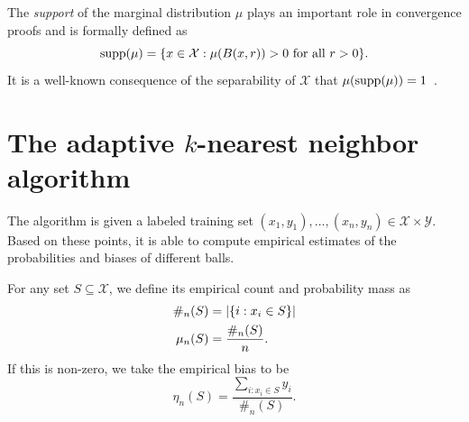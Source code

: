 \documentclass{article}
\def\X{{\mathcal X}}
\def\Y{{\mathcal Y}}
\def\supp{{\rm supp}}
\begin{document}
The {\it support} of the marginal distribution $\mu$ plays an important role in convergence proofs and is formally defined as
$$ \supp(\mu) = \{x \in \X: \mbox{$\mu(B(x,r)) > 0$ for all $r > 0$}\} .$$
It is a well-known consequence of the separability of $\X$ that $\mu(\supp(\mu)) = 1$~\cite{CH67}.



\section{The adaptive $k$-nearest neighbor algorithm}

The algorithm is given a labeled training set
$(x_1, y_1), \ldots, (x_n, y_n) \in \X \times \Y$.
Based on these points, it is able to compute empirical estimates of the probabilities and biases of different balls.

For any set $S \subseteq \X$, we define its empirical count and probability mass as
\begin{align}
\notag \#_n(S) &= |\{i: x_i \in S\}| \\
\mu_n(S) &= \frac{\#_n(S)}{n} .
\label{eq:empirical-mass}
\end{align}
If this is non-zero, we take the empirical bias to be
\begin{equation}
\eta_n(S) = \frac{\sum_{i: x_i \in S} y_i}{\#_n(S)} .
\label{eq:empirical-bias}
\end{equation}
\end{document}
